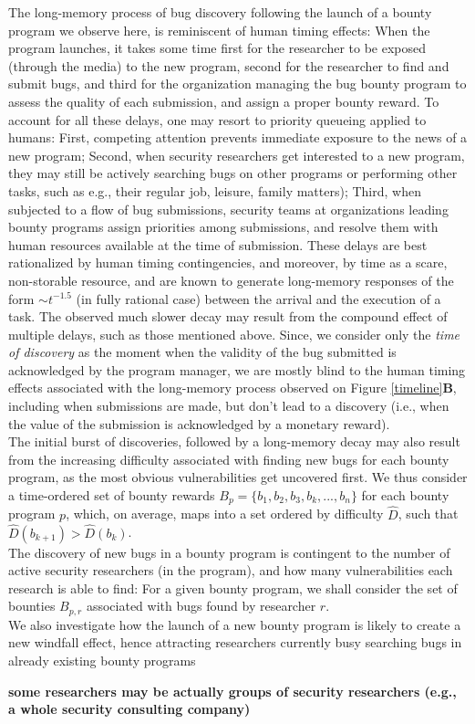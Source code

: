The long-memory process of bug discovery following the launch of a bounty program we observe here, is reminiscent of human timing effects: When the program launches, it takes some time first for the researcher to be exposed (through the media) to the new program, second for the researcher to find and submit bugs, and third for the organization managing the bug bounty program to assess the quality of each submission, and assign a proper bounty reward. To account for all these delays, one may resort to priority queueing applied to humans: First, competing attention prevents immediate exposure to the news of a new program; Second, when security researchers get interested to a new program, they may still be actively searching bugs on other programs or performing other tasks, such as e.g., their regular job, leisure, family matters); Third, when subjected to a flow of bug submissions, security teams at organizations leading bounty programs assign priorities among submissions, and resolve them with human resources available at the time of submission. These delays are best rationalized by human timing contingencies, and moreover, by time as a scare, non-storable resource, and are known to generate long-memory responses of the form $\sim t^{-1.5}$ (in fully rational case) between the arrival and the execution of a task\cite{maillart2011quantification}. The observed much slower decay may result from the compound effect of multiple delays, such as those mentioned above. Since, we consider only the {\it time of discovery} as the moment when the validity of the bug submitted is acknowledged by the program manager, we are mostly blind to the human timing effects associated with the long-memory process observed on Figure \ref{timeline}{\bf B}, including when submissions are made, but don't lead to a discovery (i.e., when the value of the submission is acknowledged by a monetary reward).\\

The initial burst of discoveries, followed by a long-memory decay may also result from the increasing difficulty associated with finding new bugs for each bounty program, as the most obvious vulnerabilities get uncovered first. We thus consider a time-ordered set of bounty rewards $B_p= \{b_1,b_2,b_3,b_k, ..., b_n\}$ for each bounty program $p$, which, on average, maps into a set ordered by difficulty $\widehat{D}$, such that $\widehat{D}(b_{k+1}) > \widehat{D}(b_{k})$.\\
 
The discovery of new bugs in a bounty program is contingent to the number of active security researchers (in the program), and how many vulnerabilities each research is able to find: For a given bounty program, we shall consider the set of bounties $B_{p,r}$ associated with bugs found by researcher $r$.\\

We also investigate how the launch of a new bounty program is likely to create a new windfall effect, hence attracting researchers currently busy searching bugs in already existing bounty programs


{\bf some researchers may be actually groups of security researchers (e.g., a whole security consulting company)}



